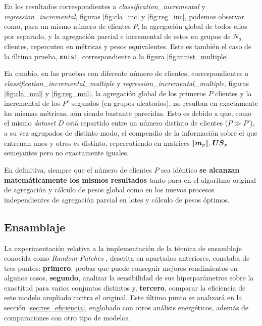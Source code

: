 \documentclass[00-Trabajo_Final.tex]{subfiles}
\begin{document}
\vspace{0.5em}

En los resultados correspondientes a \textit{classification\_incremental} y \textit{regression\_incremental}, figuras \ref{fig:cla_inc} y \ref{fig:reg_inc}, podemos observar como, para un mismo número de clientes $P$, la agregación global de todos ellos por separado, y la agregación parcial e incremental de estos en grupos de $N_g$ clientes, repercuten en métricas y pesos equivalentes. Este es también el caso de la última prueba, \verb|mnist|, correspondiente a la figura \ref{fig:mnist_multiple}.

\vspace{0.5em}

En cambio, en las pruebas con diferente número de clientes, correspondientes a \textit{classification\_incremental\_multiple} y \textit{regression\_incremental\_multiple}, figuras \ref{fig:cla_mul} y \ref{fig:reg_mul}, la agregación global de los primeros $P$ clientes y la incremental de los $P'$ segundos (en grupos aleatorios), no resultan en exactamente las mismas métricas, aún siendo bastante parecidas. Esto es debido a que, como el mismo \textit{dataset} $D$ está repartido entre un número distinto de clientes ($P \gg P'$), a su vez agrupados de distinto modo, el compendio de la información sobre el que entrenan unos y otros es distinto, repercutiendo en matrices $[\![\boldsymbol{m}_p]\!],\,\boldsymbol{US}_p$ semejantes pero no exactamente iguales.

\vspace{0.5em}

En definitiva, siempre que el número de clientes $P$ sea idéntico \textbf{se alcanzan matemáticamente los mismos resultados} tanto para en el algoritmo original de agregación y cálculo de pesos global como en los nuevos procesos independientes de agregación parcial en lotes y cálculo de pesos óptimos.


\subsection{Ensamblaje} \label{sec:result_ensamblaje}
La experimentación relativa a la implementación de la técnica de ensamblaje conocida como \textit{Random Patches} \cite{random_patches}, descrita en apartados anteriores, constaba de tres puntos: \textbf{primero}, probar que puede conseguir mejores rendimientos en algunos casos, \textbf{segundo}, analizar la sensibilidad de sus hiperparámetros sobre la exactitud para varios conjuntos distintos y, \textbf{tercero}, comparar la eficiencia de este modelo ampliado contra el original. Este último punto se analizará en la sección \ref{sec:res_eficiencia}, englobado con otros análisis energéticos, además de comparaciones con otro tipo de modelos.
\end{document}
